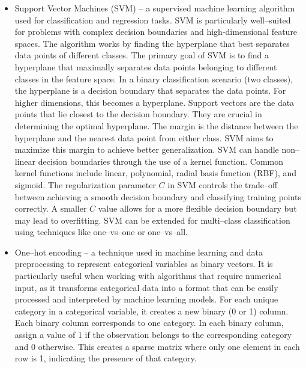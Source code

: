 \documentclass[11pt,a4paper]{article}\usepackage[]{graphicx}\usepackage[]{xcolor}
\begin{document}
\begin{itemize}
	\item Support Vector Machines (SVM) -- a supervised machine learning algorithm used for classification and regression tasks. SVM is particularly well--suited for problems with complex decision boundaries and high-dimensional feature spaces. The algorithm works by finding the hyperplane that best separates data points of different classes. The primary goal of SVM is to find a hyperplane that maximally separates data points belonging to different classes in the feature space. In a binary classification scenario (two classes), the hyperplane is a decision boundary that separates the data points. For higher dimensions, this becomes a hyperplane.
Support vectors are the data points that lie closest to the decision boundary. They are crucial in determining the optimal hyperplane. The margin is the distance between the hyperplane and the nearest data point from either class. SVM aims to maximize this margin to achieve better generalization.
SVM can handle non--linear decision boundaries through the use of a kernel function. Common kernel functions include linear, polynomial, radial basis function (RBF), and sigmoid. The regularization parameter $C$ in SVM controls the trade--off between achieving a smooth decision boundary and classifying training points correctly. A smaller $C$ value allows for a more flexible decision boundary but may lead to overfitting. SVM can be extended for multi--class classification using techniques like one--vs--one or one--vs--all.
	
	\item One--hot encoding -- a technique used in machine learning and data preprocessing to represent categorical variables as binary vectors. It is particularly useful when working with algorithms that require numerical input, as it transforms categorical data into a format that can be easily processed and interpreted by machine learning models. For each unique category in a categorical variable, it creates a new binary (0 or 1) column. Each binary column corresponds to one category. In each binary column, assign a value of 1 if the observation belongs to the corresponding category and 0 otherwise. This creates a sparse matrix where only one element in each row is 1, indicating the presence of that category.


\end{itemize}
\end{document}
